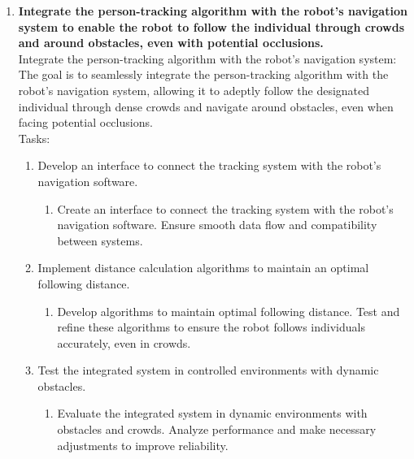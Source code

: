 \documentclass{article}
\begin{document}
\begin{enumerate}
\begin{enumerate}
\end{enumerate}

\item \textbf{Integrate the person-tracking algorithm with the robot’s navigation system to enable the robot to follow the individual through crowds and around obstacles, even with potential occlusions.}\\
Integrate the person-tracking algorithm with the robot’s navigation system: The goal is to seamlessly integrate the person-tracking algorithm with the robot’s navigation system, allowing it to adeptly follow the designated individual through dense crowds and navigate around obstacles, even when facing potential occlusions.\\
Tasks:
\begin{enumerate}
    \item Develop an interface to connect the tracking system with the robot’s navigation software.
    \begin{enumerate}
        \item Create an interface to connect the tracking system with the robot’s navigation software. Ensure smooth data flow and compatibility between systems.
    \end{enumerate}
    
    \item Implement distance calculation algorithms to maintain an optimal following distance.
    \begin{enumerate}
        \item Develop algorithms to maintain optimal following distance. Test and refine these algorithms to ensure the robot follows individuals accurately, even in crowds.
    \end{enumerate}
    
    \item Test the integrated system in controlled environments with dynamic obstacles.
    \begin{enumerate}
        \item Evaluate the integrated system in dynamic environments with obstacles and crowds. Analyze performance and make necessary adjustments to improve reliability.
    \end{enumerate}
    
\end{enumerate}


\end{enumerate}
\end{document}
